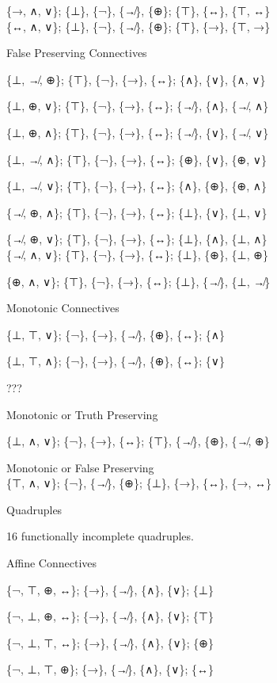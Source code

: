 \{→, ∧, ∨\}; \{⊥\}, \{¬\}, \{↛\}, \{⊕\}; \{⊤\}, \{↔\}, \{⊤, ↔\}\\
\{↔, ∧, ∨\}; \{⊥\}, \{¬\}, \{↛\}, \{⊕\}; \{⊤\}, \{→\}, \{⊤, →\}

\protect\hypertarget{anchor-17}{}{}False Preserving Connectives

\{⊥, ↛, ⊕\}; \{⊤\}, \{¬\}, \{→\}, \{↔\}; \{∧\}, \{∨\}, \{∧, ∨\}

\{⊥, ⊕, ∨\}; \{⊤\}, \{¬\}, \{→\}, \{↔\}; \{↛\}, \{∧\}, \{↛, ∧\}

\{⊥, ⊕, ∧\}; \{⊤\}, \{¬\}, \{→\}, \{↔\}; \{↛\}, \{∨\}, \{↛, ∨\}

\{⊥, ↛, ∧\}; \{⊤\}, \{¬\}, \{→\}, \{↔\}; \{⊕\}, \{∨\}, \{⊕, ∨\}

\{⊥, ↛, ∨\}; \{⊤\}, \{¬\}, \{→\}, \{↔\}; \{∧\}, \{⊕\}, \{⊕, ∧\}

\{↛, ⊕, ∧\}; \{⊤\}, \{¬\}, \{→\}, \{↔\}; \{⊥\}, \{∨\}, \{⊥, ∨\}

\{↛, ⊕, ∨\}; \{⊤\}, \{¬\}, \{→\}, \{↔\}; \{⊥\}, \{∧\}, \{⊥, ∧\}\\
\{↛, ∧, ∨\}; \{⊤\}, \{¬\}, \{→\}, \{↔\}; \{⊥\}, \{⊕\}, \{⊥, ⊕\}

\{⊕, ∧, ∨\}; \{⊤\}, \{¬\}, \{→\}, \{↔\}; \{⊥\}, \{↛\}, \{⊥, ↛\}

\protect\hypertarget{anchor-18}{}{}Monotonic Connectives

\{⊥, ⊤, ∨\}; \{¬\}, \{→\}, \{↛\}, \{⊕\}, \{↔\}; \{∧\}

\{⊥, ⊤, ∧\}; \{¬\}, \{→\}, \{↛\}, \{⊕\}, \{↔\}; \{∨\}

\protect\hypertarget{anchor-19}{}{}???

Monotonic or Truth Preserving

\{⊥, ∧, ∨\}; \{¬\}, \{→\}, \{↔\}; \{⊤\}, \{↛\}, \{⊕\}, \{↛, ⊕\}

Monotonic or False Preserving\\
\{⊤, ∧, ∨\}; \{¬\}, \{↛\}, \{⊕\}; \{⊥\}, \{→\}, \{↔\}, \{→, ↔\}

\protect\hypertarget{anchor-20}{}{}Quadruples

16 functionally incomplete quadruples.

\protect\hypertarget{anchor-21}{}{}Affine Connectives

\{¬, ⊤, ⊕, ↔\}; \{→\}, \{↛\}, \{∧\}, \{∨\}; \{⊥\}

\{¬, ⊥, ⊕, ↔\}; \{→\}, \{↛\}, \{∧\}, \{∨\}; \{⊤\}

\{¬, ⊥, ⊤, ↔\}; \{→\}, \{↛\}, \{∧\}, \{∨\}; \{⊕\}

\{¬, ⊥, ⊤, ⊕\}; \{→\}, \{↛\}, \{∧\}, \{∨\}; \{↔\}

